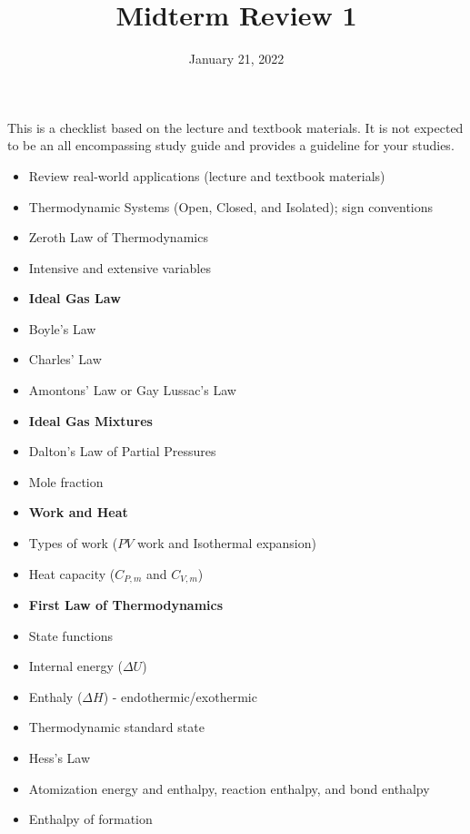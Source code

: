 \documentclass[11pt]{article}
\title{\textbf{Midterm Review 1}}
\date{\vspace{-2em}January 21, 2022}
\begin{document}
\maketitle

This is a checklist based on the lecture and textbook materials. It is not
expected to be an all encompassing study guide and provides a guideline for
your studies.

\begin{itemize}
\item Review real-world applications (lecture and textbook materials)
\item Thermodynamic Systems (Open, Closed, and Isolated); sign conventions
\item Zeroth Law of Thermodynamics
\item Intensive and extensive variables
\item[] \textbf{Ideal Gas Law}
\item Boyle's Law
\item Charles' Law
\item Amontons' Law or Gay Lussac's Law
\item[] \textbf{Ideal Gas Mixtures}
\item Dalton's Law of Partial Pressures
\item Mole fraction
\item[] \textbf{Work and Heat}
\item Types of work ($PV$ work and Isothermal expansion)
\item Heat capacity ($C_{P,m}$ and $C_{V,m}$)
\item[] \textbf{First Law of Thermodynamics}
\item State functions
\item Internal energy ($\Delta U$)
\item Enthaly ($\Delta H$) - endothermic/exothermic
\item Thermodynamic standard state
\item Hess's Law
\item Atomization energy and enthalpy, reaction enthalpy, and bond enthalpy
\item Enthalpy of formation
\end{itemize}
\end{document}
